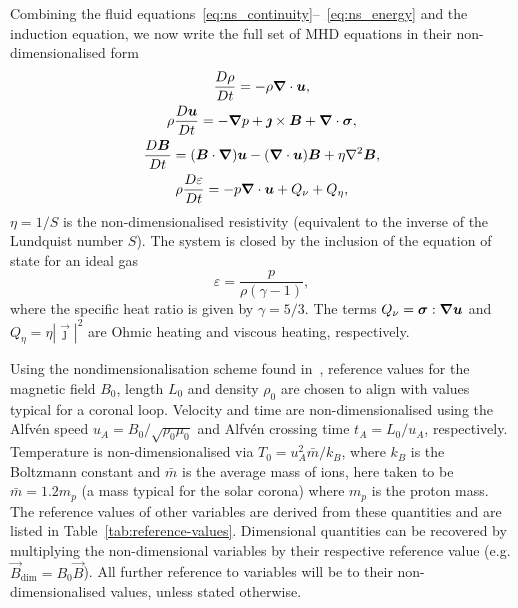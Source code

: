 Combining the fluid equations~\ref{eq:ns_continuity}--~\ref{eq:ns_energy} and the induction equation, we now write the full set of MHD equations in their non-dimensionalised form
\begin{gather}
\label{eq:mhda}
\frac{D\rho}{Dt} = - \rho \vec{\nabla} \cdot \vec{u},\\
\rho\frac{D\vec{u}}{Dt} = -\vec{\nabla} p + \vec{\jmath} \times \vec{B} + \vec{\nabla} \cdot \ten{\sigma},\\
\frac{D\vec{B}}{Dt} = (\vec{B} \cdot \vec{\nabla})\vec{u} - (\vec{\nabla} \cdot \vec{u})\vec{B} + \eta \nabla^2 \vec{B},\\
\rho\frac{D\varepsilon}{Dt} = -p \vec{\nabla} \cdot \vec{u} + {Q}_{\nu} + {Q}_{\eta},%
\label{eq:energy}
\end{gather}
$\eta = 1/S$ is the non-dimensionalised resistivity (equivalent
to the inverse of the Lundquist number $S$). The system is closed by the inclusion of the equation of state for an ideal gas
\begin{equation}
\varepsilon = \frac{p}{\rho(\gamma - 1)},
\end{equation}
where the specific heat ratio is given by $\gamma = 5/3$. The
  terms ${Q}_{\nu} = {\bm \sigma} : {\bm \nabla}{\bm u}$ and
  ${Q}_{\eta} = \eta | \vec{\jmath} |^2$ are Ohmic heating and viscous heating, respectively.

Using the nondimensionalisation scheme found
in~\cite{arberStaggeredGridLagrangian2001}, reference values for the
magnetic field $B_0$, length $L_0$ and density $\rho_0$ are chosen to
align with values typical for a coronal loop. Velocity and time are
non-dimensionalised using the Alfv\'en speed $u_A = B_0 / \sqrt{\rho_0
  \mu_0}$ and Alfv\'en crossing time $t_A = L_0/u_A$,
respectively. Temperature is non-dimensionalised via $T_0 = u_A^2
\bar{m} / k_B$, where $k_B$ is the Boltzmann constant and $\bar{m}$ is
the average mass of ions, here taken to be $\bar{m} = 1.2m_p$ (a mass
typical for the solar corona) where $m_p$ is the proton mass. The
reference values of other variables are derived from these
quantities and are listed in Table~\ref{tab:reference-values}. Dimensional quantities can be recovered by multiplying the non-dimensional variables by their respective reference value (e.g. $\vec{B}_{\dim} = B_0 \vec{B}$). All further reference to variables will be to their non-dimensionalised values, unless stated otherwise.

